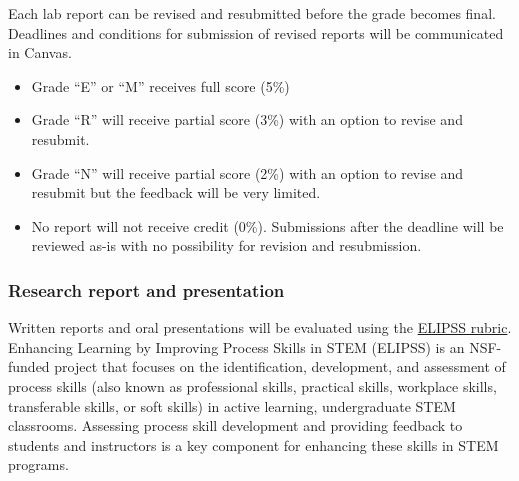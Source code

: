Each lab report can be revised and resubmitted before the grade becomes
final. Deadlines and conditions for submission of revised reports will
be communicated in Canvas.

\begin{itemize}
\tightlist
\item
  Grade ``E'' or ``M'' receives full score (5\%)
\item
  Grade ``R'' will receive partial score (3\%) with an option to revise
  and resubmit.
\item
  Grade ``N'' will receive partial score (2\%) with an option to revise
  and resubmit but the feedback will be very limited.
\item
  No report will not receive credit (0\%). Submissions after the
  deadline will be reviewed as-is with no possibility for revision and
  resubmission.
\end{itemize}

\subsubsection{Research report and
presentation}\label{research-report-and-presentation}

Written reports and oral presentations will be evaluated using the
\href{https://drive.google.com/file/d/1ZAL5_sTpci3waFMQVWRrhFqTF9uOIwv9/view?usp=sharing}{ELIPSS
rubric}. Enhancing Learning by Improving Process Skills in STEM (ELIPSS)
is an NSF-funded project that focuses on the identification,
development, and assessment of process skills (also known as
professional skills, practical skills, workplace skills, transferable
skills, or soft skills) in active learning, undergraduate STEM
classrooms. Assessing process skill development and providing feedback
to students and instructors is a key component for enhancing these
skills in STEM programs.
